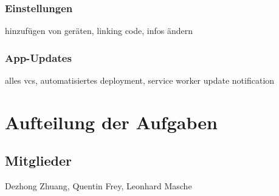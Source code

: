 \documentclass[a4paper]{article}
\begin{document}
\subsubsection{Einstellungen}
hinzufügen von geräten, linking code, infos ändern

\subsubsection{App-Updates}
alles vcs, automatisiertes deployment, service worker update notification


\section{Aufteilung der Aufgaben}

\subsection{Mitglieder}
Dezhong Zhuang, Quentin Frey, Leonhard Masche
\end{document}
